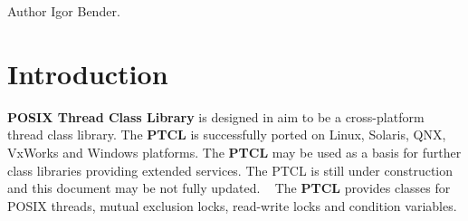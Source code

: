 \begin{DoxyAuthor}{Author}
Igor Bender.
\end{DoxyAuthor}
\hypertarget{index_intro_sec}{}\section{Introduction}\label{index_intro_sec}
{\bfseries P\+O\+S\+IX Thread Class Library} is designed in aim to be a cross-\/platform thread class library. The {\bfseries P\+T\+CL} is successfully ported on Linux, Solaris, Q\+NX, Vx\+Works and Windows platforms. The {\bfseries P\+T\+CL} may be used as a basis for further class libraries providing extended services. The P\+T\+CL is still under construction and this document may be not fully updated. ~\newline
 The {\bfseries P\+T\+CL} provides classes for P\+O\+S\+IX threads, mutual exclusion locks, read-\/write locks and condition variables. 